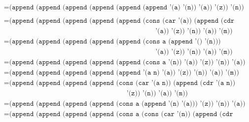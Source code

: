\documentclass[letterpaper,11pt]{article}
\begin{document}
\begin{enumerate}
\begin{enumerate}
\begin{align*}
            &= \texttt{(append (append (append (append (append (append '(a) '(n)) '(a)) '(z)) '(n)) '(a)) '(m))} \\
        \end{align*}
        \begin{align*}
            &= \texttt{(append (append (append (append (append (cons (car '(a)) (append (cdr '(a)) '(n)))} \\ 
            & \; \; \; \; \; \; \; \; \; \; \; \; \; \; \; \; \; \; \; \; \; \; \;
              \; \; \; \; \; \; \; \; \; \; \; \; \; \; \; \; \; \; \; \; \; \; \;
              \; \; \; \; \; \; \; \; \; \; \; \; \; \; \; \; \; \; \; \; \; \; \; 
              \; \; \; \; \; \; \; \; \; \; 
                                                       \texttt{'(a)) '(z)) '(n)) '(a)) '(m))} \\
            &= \texttt{(append (append (append (append (append (cons a (append '() '(n)))} \\ 
            & \; \; \; \; \; \; \; \; \; \; \; \; \; \; \; \; \; \; \; \; \; \; \;
              \; \; \; \; \; \; \; \; \; \; \; \; \; \; \; \; \; \; \; \; \; \; \;
              \; \; \; \; \; \; \; \; \; \; \; \; \; \; \; \; \; \; \; \; \; \; \; 
              \; \; \; \; \; \; \; \; \; \; 
                                                       \texttt{'(a)) '(z)) '(n)) '(a)) '(m))} \\
            &= \texttt{(append (append (append (append (append (cons a '(n)) '(a)) '(z)) '(n)) '(a)) '(m))} \\
            &= \texttt{(append (append (append (append (append '(a n) '(a)) '(z)) '(n)) '(a)) '(m))} \\ 
            &= \texttt{(append (append (append (append (cons (car '(a n)) (append (cdr '(a n)) '(a)))} \\
            & \; \; \; \; \; \; \; \; \; \; \; \; \; \; \; \; \; \; \; \; \; \; \;
              \; \; \; \; \; \; \; \; \; \; \; \; \; \; \; \; \; \; \; \; \; \; \;
              \; \; \; \; \; \; \; \; \; \; \; \; \; \; \; \; \; \;
                                                       \texttt{'(z)) '(n)) '(a)) '(m))} \\
            &= \texttt{(append (append (append (append (cons a (append '(n) '(a))) '(z)) '(n)) '(a)) '(m))} \\
            &= \texttt{(append (append (append (append (cons a (cons (car '(n)) (append (cdr '(n)) '(a))))} \\
            & \; \; \; \; \; \; \; \; \; \; \; \; \; \; \; \; \; \; \; \; \; \; \;

\end{align*}
\end{enumerate}
\end{enumerate}
\end{document}
